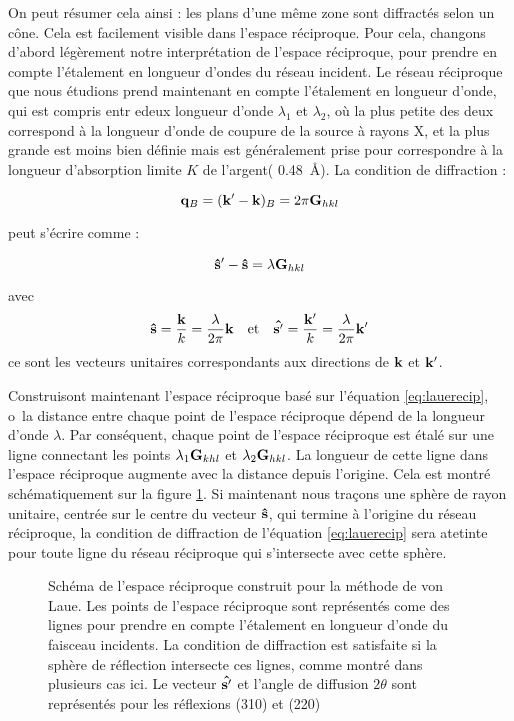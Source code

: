 On peut résumer cela ainsi : les plans d'une même zone sont diffractés selon un cône. Cela est facilement visible dans l'espace réciproque. Pour cela, changons d'abord légèrement notre interprétation de l'espace réciproque, pour prendre en compte l'étalement en longueur d'ondes du réseau incident. Le réseau réciproque que nous étudions prend maintenant en compte l'étalement en longueur d'onde, qui est compris entr edeux longueur d'onde $\lambda_1$ et $\lambda_2$, où la plus petite des deux correspond à la longueur d'onde de coupure de la source à rayons X, et la plus grande est moins bien définie mais est généralement prise pour correspondre à la longueur d'absorption limite $K$ de l'argent( \SI{0.48}{\angstrom}).
La condition de diffraction :

\begin{equation}
    \mathbf{q}_B = (\mathbf{k'-k})_B = 2 \pi \mathbf{G}_{hkl}
\end{equation}

peut s'écrire comme :

\begin{equation}
    \label{eq:lauerecip}
    \mathbf{\hat{s}}' - \mathbf{\hat{s}} = \lambda \mathbf{G}_{hkl}
\end{equation}

avec
\begin{equation}
    \mathbf{\hat{s}} = \frac{\mathbf{k}}{k} = \frac{\lambda}{2\pi}\mathbf{k}\quad\text{et}\quad
    \mathbf{\hat{s'}} = \frac{\mathbf{k'}}{k} = \frac{\lambda}{2\pi}\mathbf{k'}
\end{equation}
ce sont les vecteurs unitaires correspondants aux directions de $\mathbf{k}$ et $\mathbf{k'}$.

Construisont maintenant l'espace réciproque basé sur l'équation \ref{eq:lauerecip}, o\ la distance entre chaque point de l'espace réciproque dépend de la longueur d'onde $\lambda$. Par conséquent, chaque point de l'espace réciproque est étalé sur une ligne connectant les points $\lambda_1\mathbf{G}_{khl}$ et $\lambda_2\mathbf{G}_{hkl}$. La longueur de cette ligne dans l'espace réciproque augmente avec la distance depuis l'origine. Cela est montré schématiquement sur la figure \ref{fig:lauerecip}. Si maintenant nous traçons une sphère de rayon unitaire, centrée sur le centre du vecteur $\mathbf{\hat{s}}$, qui termine à l'origine du réseau réciproque, la condition de diffraction de l'équation \ref{eq:lauerecip} sera atetinte pour toute ligne du réseau réciproque qui s'intersecte avec cette sphère.

\begin{figure}
    \TODO
    \caption{Schéma de l'espace réciproque construit pour la méthode de von Laue. Les points de l'espace réciproque sont représentés come des lignes pour prendre en compte l'étalement en longueur d'onde du faisceau incidents. La condition de diffraction est satisfaite si la sphère de réflection intersecte ces lignes, comme montré dans plusieurs cas ici. Le vecteur $\mathbf{\hat{s'}}$ et l'angle de diffusion $2\theta$ sont représentés pour les réflexions (310) et (220)}
    \label{fig:lauerecip}
\end{figure}

